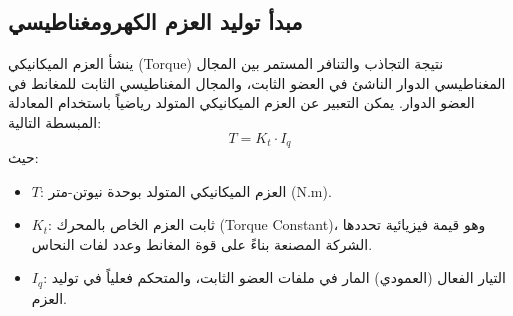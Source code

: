\subsection{مبدأ توليد العزم الكهرومغناطيسي}
ينشأ العزم الميكانيكي (\textenglish{Torque}) نتيجة التجاذب والتنافر المستمر بين المجال المغناطيسي الدوار الناشئ في العضو الثابت، والمجال المغناطيسي الثابت للمغانط في العضو الدوار. يمكن التعبير عن العزم الميكانيكي المتولد رياضياً باستخدام المعادلة المبسطة التالية:
$$T = K_t \cdot I_q$$
حيث:
\begin{itemize}
    \item $T$: العزم الميكانيكي المتولد بوحدة نيوتن-متر (\textenglish{N.m}).
    \item $K_t$: ثابت العزم الخاص بالمحرك (\textenglish{Torque Constant})، وهو قيمة فيزيائية تحددها الشركة المصنعة بناءً على قوة المغانط وعدد لفات النحاس.
    \item $I_q$: التيار الفعال (العمودي) المار في ملفات العضو الثابت، والمتحكم فعلياً في توليد العزم.
\end{itemize}